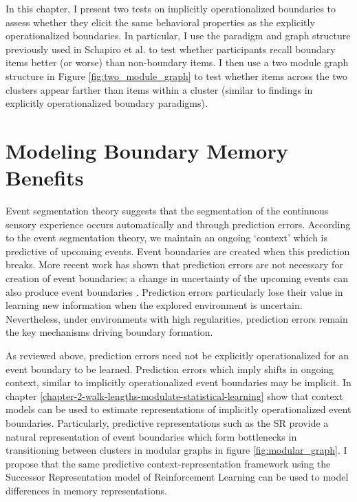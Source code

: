 In this chapter, I present two tests on implicitly operationalized boundaries to assess whether they elicit the same behavioral properties as the explicitly operationalized boundaries. In particular, I use the paradigm and graph structure previously used in Schapiro et al. \cite{schapiro2013neural} to test whether participants recall boundary items better (or worse) than non-boundary items. I then use a two module graph structure in Figure \ref{fig:two_module_graph} to test whether items across the two clusters appear farther than items within a cluster (similar to findings in explicitly operationalized boundary paradigms). 

\section{Modeling Boundary Memory Benefits}
Event segmentation theory suggests that the segmentation of the continuous sensory experience occurs automatically and through prediction errors\cite{zacks2007event,zacks2007eventp, swallow2009event}. According to the event segmentation theory, we maintain an ongoing `context' which is predictive of upcoming events. Event boundaries are created when this prediction breaks. More recent work has shown that prediction errors are not necessary for creation of event boundaries; a change in uncertainty of the upcoming events can also produce event boundaries \cite{shin2021structuring}. Prediction errors particularly lose their value in learning new information when the explored environment is uncertain\cite{behrens2007learning}. Nevertheless, under environments with high regularities, prediction errors remain the key mechanisms driving boundary formation. 

As reviewed above, prediction errors need not be explicitly operationalized for an event boundary to be learned. Prediction errors which imply shifts in ongoing context, similar to implicitly operationalized event boundaries may be implicit. In chapter \ref{chapter-2-walk-lengths-modulate-statistical-learning} show that context models can be used to estimate representations of implicitly operationalized event boundaries. Particularly, predictive representations such as the SR provide a natural representation of event boundaries which form bottlenecks in transitioning between clusters in modular graphs in figure \ref{fig:modular_graph}. I propose that the same predictive context-representation framework using the Successor Representation model of Reinforcement Learning \cite{dayan1993improving, momennejad2017successor, russek2017predictive, momennejad2020learning,gershman2012successor} can be used to model differences in memory representations. 

